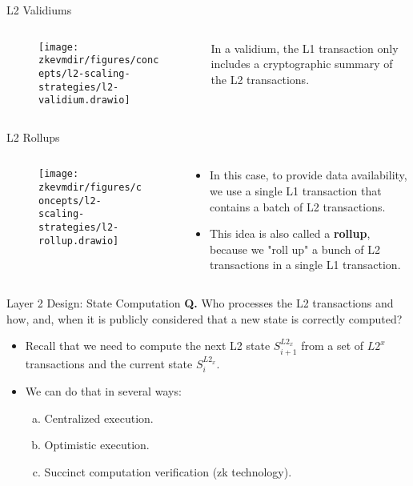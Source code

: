 \begin{frame}{L2 Validiums}
\begin{columns}
\begin{column}{0.65\textwidth}
\begin{figure}
\texttt{[image: \\zkevmdir/figures/concepts/l2-scaling-strategies/l2-validium.drawio]}
\end{figure}
\end{column}
\begin{column}{0.35\textwidth}
 In a validium, the L1 transaction only includes a cryptographic summary of the L2 transactions.
\end{column}
\end{columns}
\end{frame}




\begin{frame}{L2 Rollups}
\begin{columns}
\begin{column}{0.65\textwidth}
\begin{figure}
\texttt{[image: \\zkevmdir/figures/concepts/l2-scaling-strategies/l2-rollup.drawio]}
\end{figure}
\end{column}

\begin{column}{0.35\textwidth}
\begin{itemize}
\item In this case, to provide data availability, we use a single L1 transaction that contains a batch of L2 transactions.
\item This idea is also called a \textbf{rollup}, because we "roll up" a bunch of L2 transactions in a single L1 transaction.
\end{itemize}
\end{column}
\end{columns}
\end{frame}







\begin{frame}{Layer 2 Design: State Computation}
\textbf{Q.} Who processes the L2 transactions and how, and, when it is publicly considered that a new state is correctly computed?
\begin{itemize}
\item Recall that we need to compute the next L2 state $S^{L2_x}_{i+1}$ from a set of $L2^x$ transactions and the current state $S^{L2_x}_i$.
\item We can do that in several ways:
  \begin{enumerate}[a)]
  \item Centralized execution.
  \item Optimistic execution.
  \item Succinct computation verification (zk technology).
  \end{enumerate}
\end{itemize}
\end{frame}







